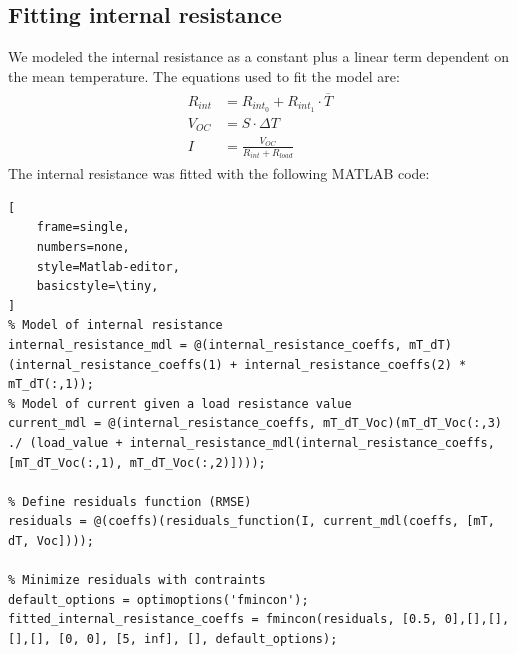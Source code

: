 

\subsection{Fitting internal resistance}
We modeled the internal resistance as a constant plus a linear term dependent on the mean temperature. 
The equations used to fit the model are:
\begin{align}
    \begin{split}
    R_{int} &= R_{int_0} + R_{int_1} \cdot \overline{T} \\
    V_{OC} &= S \cdot \Delta T \\
    I &= \frac{V_{OC}}{R_{int} + R_{load}}
    \end{split}
\end{align}
The internal resistance was fitted with the following MATLAB code:

\begin{lstlisting}[
    frame=single,
    numbers=none,
    style=Matlab-editor,
    basicstyle=\tiny,
]
% Model of internal resistance
internal_resistance_mdl = @(internal_resistance_coeffs, mT_dT)(internal_resistance_coeffs(1) + internal_resistance_coeffs(2) * mT_dT(:,1));
% Model of current given a load resistance value
current_mdl = @(internal_resistance_coeffs, mT_dT_Voc)(mT_dT_Voc(:,3) ./ (load_value + internal_resistance_mdl(internal_resistance_coeffs, [mT_dT_Voc(:,1), mT_dT_Voc(:,2)])));

% Define residuals function (RMSE)
residuals = @(coeffs)(residuals_function(I, current_mdl(coeffs, [mT, dT, Voc])));

% Minimize residuals with contraints
default_options = optimoptions('fmincon');
fitted_internal_resistance_coeffs = fmincon(residuals, [0.5, 0],[],[],[],[], [0, 0], [5, inf], [], default_options);
\end{lstlisting}

